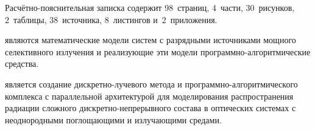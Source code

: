 

Расчётно-пояснительная записка содержит 98~страниц, 4~части, 30~рисунков, 2~таблицы, 38~источника, 8~листингов и~2~приложения.

 являются математические модели систем с разрядными источниками мощного селективного излучения и реализующие эти модели программно-алгоритмические средства.

 является создание дискретно-лучевого метода и программно-алгоритмического комплекса с параллельной архитектурой для моделирования распространения радиации сложного дискретно-непрерывного состава в оптических системах с неоднородными поглощающими и излучающими средами.


